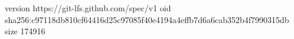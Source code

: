 version https://git-lfs.github.com/spec/v1
oid sha256:c97118db810cf64416d25c97085f40e4194a4effb7d6a6cab352b4f7990315db
size 174916
